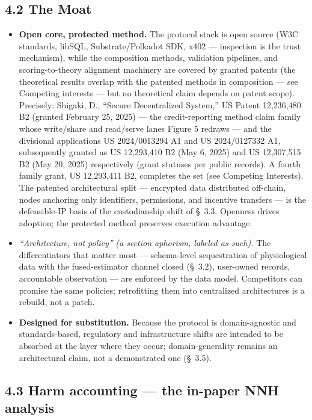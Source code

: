 \documentclass[11pt,twocolumn]{article}
\begin{document}
\subsection*{4.2 The Moat}

\begin{itemize}
\item \textbf{Open core, protected method.} The protocol stack is open source (W3C standards, libSQL, Substrate/Polkadot SDK, x402 --- inspection is the trust mechanism), while the composition methods, validation pipelines, and scoring-to-theory alignment machinery are covered by granted patents (the theoretical results overlap with the patented methods in composition --- see Competing interests --- but no theoretical claim depends on patent scope). Precisely: Shigaki, D., ``Secure Decentralized System,'' US Patent 12,236,480 B2 (granted February 25, 2025) \citep{shigaki2025us12236480} --- the credit-reporting method claim family whose write/share and read/serve lanes Figure 5 redraws --- and the divisional applications US 2024/0013294 A1 and US 2024/0127332 A1, subsequently granted as US 12,293,410 B2 (May 6, 2025) and US 12,307,515 B2 (May 20, 2025) respectively \citep{shigaki2025us12293410,shigaki2025us12307515} (grant statuses per public records). A fourth family grant, US 12,293,411 B2, completes the set (see Competing Interests). The patented architectural split --- encrypted data distributed off-chain, nodes anchoring only identifiers, permissions, and incentive transfers --- is the defensible-IP basis of the custodianship shift of \S~3.3. Openness drives adoption; the protected method preserves execution advantage.
\item \emph{``Architecture, not policy''} \emph{(a section aphorism, labeled as such).} The differentiators that matter most --- schema-level sequestration of physiological data with the fused-estimator channel closed (\S~3.2), user-owned records, accountable observation --- are enforced by the data model. Competitors can promise the same policies; retrofitting them into centralized architectures is a rebuild, not a patch.
\item \textbf{Designed for substitution.} Because the protocol is domain-agnostic and standards-based, regulatory and infrastructure shifts are intended to be absorbed at the layer where they occur; domain-generality remains an architectural claim, not a demonstrated one (\S~3.5).
\end{itemize}

\subsection*{4.3 Harm accounting --- the in-paper NNH analysis}
\end{document}
